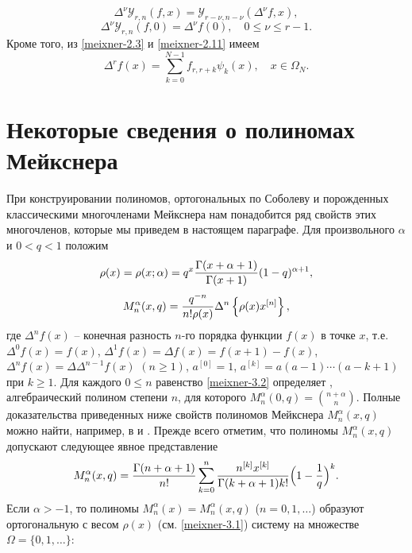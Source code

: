  \begin{equation}\label{meixner-2.15}
 \Delta^\nu\mathcal{Y}_{r,n}(f,x) = \mathcal{Y}_{r-\nu,n-\nu}(\Delta^\nu f,x),
  \end{equation}
\begin{equation}\label{sob-tcheb-difference-2.16}
\Delta^\nu\mathcal{Y}_{r,n}(f,0) = \Delta^\nu f(0), \quad 0\le \nu\le r-1.
\end{equation}
Кроме того, из \eqref{meixner-2.3} и \eqref{meixner-2.11} имеем
 \begin{equation}\label{sob-tcheb-difference-2.17}
 \Delta^r f(x)= \sum_{k=0}^{N-1} f_{r,r+k} \psi_{k}(x), \quad x\in \Omega_{N}.
  \end{equation}

\section{Некоторые сведения о полиномах Мейкснера}
При конструировании полиномов, ортогональных по Соболеву и порожденных классическими многочленами Мейкснера нам понадобится ряд свойств этих многочленов, которые мы приведем в настоящем параграфе.
 Для произвольного $\alpha$ и $0<q<1$ положим
\begin{equation}
\rho(x)=\rho(x;\alpha)=q^x{\Gamma(x+\alpha+1)\over \Gamma(x+1)}(1-q)^{\alpha+1}, \label{meixner-3.1}
\end{equation}
\begin{equation}\label{meixner-3.2}
M_n^{\alpha}(x,q)={q^{-n}\over n!\rho(x)}\Delta^n
\left\{\rho(x)x^{[n]}\right\},
\end{equation}
 где $\Delta^nf(x)$ -- конечная разность $n$-го порядка функции
     $f(x)$ в точке $x$, т.е. $\Delta^0f(x)=f(x)$,
$\Delta^1f(x)=\Delta f(x)=f(x+1)-f(x)$, $\Delta^nf(x)=\Delta
\Delta^{n-1}f(x)$ $(n\ge1)$, $a^{[0]}=1$,
$a^{[k]}=a(a-1)\cdots(a-k+1)$ при $k\ge1$. Для каждого $0\le n$ равенство \eqref{meixner-3.2} определяет \cite{meixner-22}, алгебраический полином степени $n$,   для которого
$
M_n^{\alpha}(0,q)={n+\alpha\choose n}.
$
Полные доказательства приведенных ниже свойств полиномов Мейкснера $M_n^{\alpha}(x,q)$
можно найти, например, в \cite{Haar-Tcheb-Gasper} и \cite{meixner-22}. Прежде всего отметим, что полиномы  $M_n^{\alpha}(x,q)$ допускают  следующее явное представление
\begin{equation}\label{meixner-3.3}
M_n^{\alpha}(x,q)={\Gamma(n+\alpha+1)\over
n!}\sum_{k=0}^n {n^{[k]}x^{[k]}\over
\Gamma(k+\alpha+1) k!}\Big(1-\frac{1}{q}\Big)^k.
\end{equation}
Если $\alpha>-1$, то полиномы $M_n^{\alpha}(x)=M_n^{\alpha}(x,q)$ ($n=0,1,\ldots$) образуют ортогональную  с весом $\rho(x)$ (см. \eqref{meixner-3.1}) систему  на множестве $\Omega=\{0,1,\ldots\}$:
